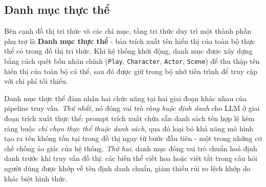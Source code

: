 \subsection{Danh mục thực thể}
\label{sec:entity_catalog}

Bên cạnh đồ thị tri thức và các chỉ mục, tầng tri thức duy trì một thành phần phụ trợ là \textbf{Danh mục thực thể} - bản trích xuất tên hiển thị của toàn bộ thực thể có trong đồ thị tri thức. Khi hệ thống khởi động, danh mục được xây dựng bằng cách quét bốn nhãn chính (\texttt{Play}, \texttt{Character}, \texttt{Actor}, \texttt{Scene}) để thu thập tên hiển thị của toàn bộ cá thể, sau đó được giữ trong bộ nhớ tiến trình để truy cập với chi phí tối thiểu.

Danh mục thực thể đảm nhận hai chức năng tại hai giai đoạn khác nhau của pipeline truy vấn. \textit{Thứ nhất}, nó đóng vai trò \textit{ràng buộc định danh} cho LLM ở giai đoạn trích xuất thực thể: prompt trích xuất chứa sẵn danh sách tên hợp lệ kèm ràng buộc \emph{chỉ chọn thực thể thuộc danh sách}, qua đó loại bỏ khả năng mô hình tạo ra tên không tồn tại trong đồ thị ngay từ bước đầu tiên - một trong những cơ chế chống ảo giác của hệ thống. \textit{Thứ hai}, danh mục đóng vai trò chuẩn hoá định danh trước khi truy vấn đồ thị: các biến thể viết hoa hoặc viết tắt trong câu hỏi người dùng được khớp về tên định danh chuẩn, giảm thiểu rủi ro lệch khớp do khác biệt hình thức.


